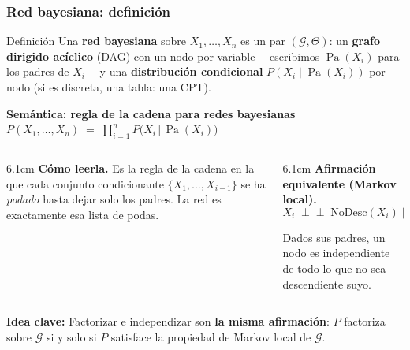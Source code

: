 \documentclass[aspectratio=169, 10pt]{beamer}
\providecommand{\Pa}{\operatorname{Pa}}
\newcommand{\indep}{\perp\!\!\!\perp}
\newcommand{\formula}[1]{%
	\begin{tcolorbox}[colback=UCMBlue!8, colframe=UCMBlue, arc=4pt,
		boxsep=2pt, left=6pt, right=6pt, top=3pt, bottom=3pt]
		#1
	\end{tcolorbox}
}
\newcommand{\idea}[1]{%
	\begin{tcolorbox}[colback=AccentGreen!6, colframe=AccentGreen, arc=3pt,
		width=\textwidth, boxsep=1pt, left=5pt, right=5pt, top=2pt, bottom=2pt,
		fontupper=\small]
		\RaggedRight\textbf{Idea clave:} #1
	\end{tcolorbox}
}
\begin{document}
\begin{frame}
\frametitle{Red bayesiana: definición}
\begin{block}{Definición}
\footnotesize
Una \textbf{red bayesiana} sobre $X_1,\dots,X_n$ es un par $(\mathcal{G}, \Theta)$: un \textbf{grafo dirigido acíclico} (DAG) con un nodo por variable ---escribimos $\Pa(X_i)$ para los padres de $X_i$--- y una \textbf{distribución condicional} $P(X_i \mid \Pa(X_i))$ por nodo (si es discreta, una tabla: una CPT).
\end{block}
\vspace{-0.1em}
\formula{\centering \textbf{Semántica: regla de la cadena para redes bayesianas}\\[3pt]
$\displaystyle P(X_1,\dots,X_n) \;=\; \prod_{i=1}^{n} P\bigl(X_i \,\big|\, \Pa(X_i)\bigr)$}
\vspace{-0.1em}
\begin{columns}[T]
\begin{column}{6.1cm}
\footnotesize
\textbf{Cómo leerla.} Es la regla de la cadena en la que cada conjunto condicionante $\{X_1,\dots,X_{i-1}\}$ se ha \emph{podado} hasta dejar solo los padres. La red es exactamente esa lista de podas.
\end{column}
\begin{column}{6.1cm}
\footnotesize
\textbf{Afirmación equivalente (Markov local).}
\vspace{-0.4em}
\[
X_i \;\indep\; \mathrm{NoDesc}(X_i) \;\big|\; \Pa(X_i)
\]
\vspace{-1.1em}

Dados sus padres, un nodo es independiente de todo lo que no sea descendiente suyo.
\end{column}
\end{columns}
\vspace{0.1em}
\idea{Factorizar e independizar son \textbf{la misma afirmación}: $P$ factoriza sobre $\mathcal{G}$ si y solo si $P$ satisface la propiedad de Markov local de $\mathcal{G}$.}
\end{frame}
\end{document}
